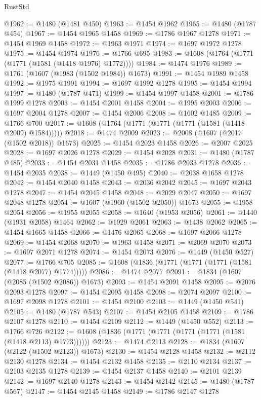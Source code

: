 \begin{lexlean}{RustStd}
\begin{coremodule}
@1962 := @1480 (@1481 @450)
@1963 := @1454 @1962
@1965 := @1480 (@1787 @454)
@1967 := @1454 @1965 @1458
@1969 := @1786 @1967 @1278
@1971 := @1454 @1969 @1458
@1972 := @1963 @1971
@1974 := @1697 @1972 @1278
@1975 := @1454 @1974
@1976 := @1766 @695
@1983 := @1608 (@1764 (@1771 (@1771 (@1581 (@1418 @1976) @1772))))
@1984 := @1474 @1976
@1989 := @1761 (@1607 (@1983 (@1502 @1984)) @1673)
@1991 := @1454 @1989 @1458
@1992 := @1975 @1991
@1994 := @1697 @1992 @1278
@1995 := @1454 @1994
@1997 := @1480 (@1787 @471)
@1999 := @1454 @1997 @1458
@2001 := @1786 @1999 @1278
@2003 := @1454 @2001 @1458
@2004 := @1995 @2003
@2006 := @1697 @2004 @1278
@2007 := @1454 @2006
@2008 := @1602 @1485
@2009 := @1766 @700
@2017 := @1608 (@1764 (@1771 (@1771 (@1771 (@1581 (@1418 @2009) @1584)))))
@2018 := @1474 @2009
@2023 := @2008 (@1607 (@2017 (@1502 @2018)) @1673)
@2025 := @1454 @2023 @1458
@2026 := @2007 @2025
@2028 := @1697 @2026 @1278
@2029 := @1454 @2028
@2031 := @1480 (@1787 @485)
@2033 := @1454 @2031 @1458
@2035 := @1786 @2033 @1278
@2036 := @1454 @2035
@2038 := @1449 (@1450 @495)
@2040 := @2038 @1658 @1278
@2042 := @1454 @2040 @1458
@2043 := @2036 @2042
@2045 := @1697 @2043 @1278
@2047 := @1454 @2045 @1458
@2048 := @2029 @2047
@2050 := @1697 @2048 @1278
@2054 := @1607 (@1960 (@1502 @2050)) @1673
@2055 := @1958 @2054
@2056 := @1955 @2055
@2058 := @1640 (@1953 @2056)
@2061 := @1440 (@1931 @2058) @1464
@2062 := @1929 @2061
@2063 := @1438 @2062
@2065 := @1454 @1665 @1458
@2066 := @1476 @2065
@2068 := @1697 @2066 @1278
@2069 := @1454 @2068
@2070 := @1963 @1458
@2071 := @2069 @2070
@2073 := @1697 @2071 @1278
@2074 := @1454 @2073
@2076 := @1449 (@1450 @527)
@2077 := @1766 @705
@2085 := @1608 (@1836 (@1771 (@1771 (@1771 (@1581 (@1418 @2077) @1774)))))
@2086 := @1474 @2077
@2091 := @1834 (@1607 (@2085 (@1502 @2086)) @1673)
@2093 := @1454 @2091 @1458
@2095 := @2076 @2093 @1278
@2097 := @1454 @2095 @1458
@2098 := @2074 @2097
@2100 := @1697 @2098 @1278
@2101 := @1454 @2100
@2103 := @1449 (@1450 @541)
@2105 := @1480 (@1787 @543)
@2107 := @1454 @2105 @1458
@2109 := @1786 @2107 @1278
@2110 := @1454 @2109
@2112 := @1449 (@1450 @552)
@2113 := @1766 @726
@2122 := @1608 (@1836 (@1771 (@1771 (@1771 (@1771 (@1581 (@1418 @2113) @1773))))))
@2123 := @1474 @2113
@2128 := @1834 (@1607 (@2122 (@1502 @2123)) @1673)
@2130 := @1454 @2128 @1458
@2132 := @2112 @2130 @1278
@2134 := @1454 @2132 @1458
@2135 := @2110 @2134
@2137 := @2103 @2135 @1278
@2139 := @1454 @2137 @1458
@2140 := @2101 @2139
@2142 := @1697 @2140 @1278
@2143 := @1454 @2142
@2145 := @1480 (@1787 @567)
@2147 := @1454 @2145 @1458
@2149 := @1786 @2147 @1278

\end{coremodule}
\end{lexlean}
